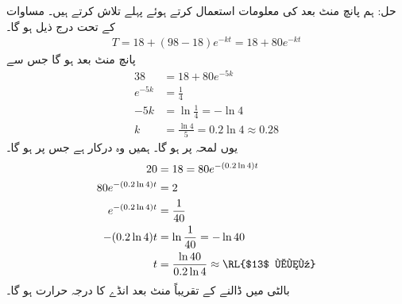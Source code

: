 حل:\quad
ہم پانچ منٹ بعد کی معلومات استعمال کرتے ہوئے پہلے  تلاش کرتے ہیں۔ مساوات  کے تحت درج ذیل ہو گا۔
\begin{align*}
T=18+(98-18)e^{-kt}=18+80e^{-kt}
\end{align*} 
پانچ منٹ بعد  ہو گا جس سے
\begin{align*}
38&=18+80e^{-5k}\\
e^{-5k}&=\frac{1}{4}\\
-5k&=\ln\frac{1}{4}=-\ln 4\\
k&=\frac{\ln 4}{5}=0.2\ln 4\approx 0.28
\end{align*}
یوں لمحہ  پر  ہو گا۔ ہمیں وہ  درکار ہے جس پر   ہو گا۔
\begin{align*}
20&=18=80e^{-(0.2\ln 4)t}\\
80e^{-(0.2\ln 4)t}&=2\\
e^{-(0.2\ln 4)t}&=\frac{1}{40}\\
-(0.2\ln 4)t&=\ln \frac{1}{40}=-\ln 40\\
t&=\frac{\ln 40}{0.2\ln 4}\approx \text{\RL{$13$ منٹ}}
\end{align*}
بالٹی میں ڈالنے کے  تقریباً  منٹ بعد انڈے کا درجہ حرارت  ہو گا۔


